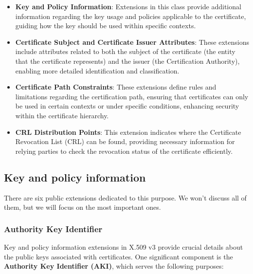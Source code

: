 \begin{itemize}
  \item \textbf{Key and Policy Information}: Extensions in this
    class provide additional information regarding the key usage and
    policies applicable to the certificate, guiding how the key
    should be used within specific contexts.

  \item \textbf{Certificate Subject and Certificate Issuer
    Attributes}: These extensions include attributes related to both
    the subject of the certificate (the entity that the certificate
    represents) and the issuer (the Certification Authority),
    enabling more detailed identification and classification.

  \item \textbf{Certificate Path Constraints}: These extensions
    define rules and limitations regarding the certification path,
    ensuring that certificates can only be used in certain contexts
    or under specific conditions, enhancing security within the
    certificate hierarchy.

  \item \textbf{CRL Distribution Points}: This extension indicates
    where the Certificate Revocation List (CRL) can be found,
    providing necessary information for relying parties to check the
    revocation status of the certificate efficiently.
\end{itemize}

\subsection{Key and policy information}


There are six public extensions dedicated to this purpose. 
We won't discuss all of them, but we will focus on the most important 
ones.

\subsubsection{Authority Key Identifier}

Key and policy information extensions in X.509 v3 provide crucial
details about the public keys associated with certificates. One
significant component is the \textbf{Authority Key Identifier (AKI)},
which serves the following purposes:

